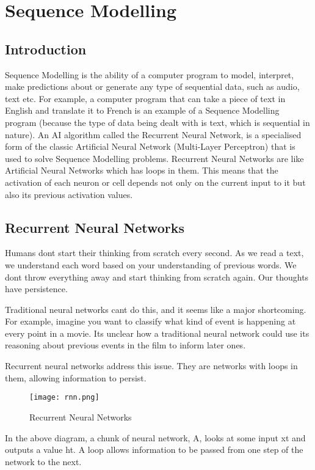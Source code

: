 \chapter{Sequence Modelling}
\section{Introduction}
Sequence Modelling is the ability of a computer program to model, interpret, make predictions about or generate any type of sequential data, such as audio, text etc. For example, a computer program that can take a piece of text in English and translate it to French is an example of a Sequence Modelling program (because the type of data being dealt with is text, which is sequential in nature). An AI algorithm called the Recurrent Neural Network, is a specialised form of the classic Artificial Neural Network (Multi-Layer Perceptron) that is used to solve Sequence Modelling problems. Recurrent Neural Networks are like Artificial Neural Networks which has loops in them. This means that the activation of each neuron or cell depends not only on the current input to it but also its previous activation values.

\section{Recurrent Neural Networks}
Humans don\textquotesingle t start their thinking from scratch every second. As we read a text, we understand each word based on your understanding of previous words. We don\textquotesingle t throw everything away and start thinking from scratch again. Our thoughts have persistence.

Traditional neural networks can\textquotesingle t do this, and it seems like a major shortcoming. For example, imagine you want to classify what kind of event is happening at every point in a movie. It\textquotesingle s unclear how a traditional neural network could use its reasoning about previous events in the film to inform later ones.

Recurrent neural networks address this issue. They are networks with loops in them, allowing information to persist.

\begin{figure}[H]
    \centering
    \texttt{[image: rnn.png]}
    \caption{Recurrent Neural Networks}
    \label{fig:RNNs}
\end{figure}

In the above diagram, a chunk of neural network, A, looks at some input xt and outputs a value ht. A loop allows information to be passed from one step of the network to the next.

